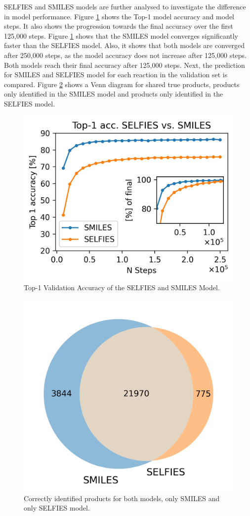 \documentclass[10pt,conference,compsocconf]{IEEEtran}
\begin{document}
SELFIES and SMILES models are further analysed to investigate the difference in model performance. Figure \ref{fig:top1} shows the Top-1 model accuracy and model steps. It also shows the progression towards the final accuracy over the first 125,000 steps. Figure \ref{fig:top1} shows that the SMILES model converges significantly faster than the SELFIES model. Also, it shows that both models are converged after 250,000 steps, as the model accuracy does not increase after 125,000 steps. Both models reach their final accuracy after 125,000 steps. Next, the prediction for SMILES and SELFIES model for each reaction in the validation set is compared. Figure \ref{fig:Venn} shows a Venn diagram for shared true products, products only identified in the SMILES model and products only identified in the SELFIES model.\\
\begin{figure}[h]
    \centering
    \includegraphics[width = .8\linewidth]{figures/accuracy.jpeg}
    \caption{Top-1 Validation Accuracy of the SELFIES and SMILES Model.}
    \label{fig:top1}
\end{figure} 

\begin{figure}[h]
    \centering
    \includegraphics[width = .5\linewidth]{./figures/venn.png}
    \caption{Correctly identified products for both models, only SMILES and only SELFIES model.}
    \label{fig:Venn}
\end{figure} 
\end{document}
